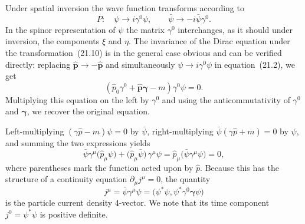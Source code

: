 Under spatial inversion the wave function transforms according to
\begin{equation}
P:\quad \psi \to i\gamma^0\psi,\qquad \bar\psi \to -i\bar\psi\gamma^0.
\tag{21.10}
\end{equation}
In the spinor representation of $\psi$ the matrix $\gamma^0$ interchanges, as it should under inversion, the components $\xi$ and $\eta$. The invariance
of the Dirac equation under the transformation~(21.10) is in the general case obvious and can be verified directly: replacing $\widehat{\mathbf{p}} \to -\widehat{\mathbf{p}}$ and simultaneously $\psi \to i\gamma^0\psi$ in equation~(21.2), we get
\[
(\widehat p_0\gamma^0 + \widehat{\mathbf{p}}\boldsymbol{\gamma} - m)\gamma^0\psi = 0.
\]
Multiplying this equation on the left by $\gamma^0$ and using the anticommutativity of $\gamma^0$ and $\boldsymbol{\gamma}$, we recover the original equation.

Left-multiplying $(\gamma\widehat p - m)\psi = 0$ by $\bar\psi$, right-multiplying $\bar\psi(\gamma\widehat p + m) = 0$ by $\psi$, and summing the two expressions yields
\[
\bar\psi\gamma^\mu\bigl(\widehat p_\mu\psi\bigr) + \bigl(\widehat p_\mu\bar\psi\bigr)\,\gamma^\mu\psi = \widehat p_\mu\bigl(\bar\psi\gamma^\mu\psi\bigr) = 0,
\]
where parentheses mark the function acted upon by $\widehat p$. Because this has the structure of a continuity equation $\partial_\mu j^\mu = 0$, the quantity
\begin{equation}
j^\mu = \bar\psi\gamma^\mu\psi = \bigl(\psi^*\psi, \psi^*\gamma^0\boldsymbol{\gamma}\psi\bigr)
\tag{21.11}
\end{equation}
is the particle current density 4-vector. We note that its time component $j^0 = \psi^*\psi$ is positive definite.


